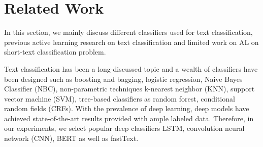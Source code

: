 \section{Related Work}
\label{sec:related}





In this section, we mainly discuss different classifiers used for text classification,  previous active learning research on text classification and limited work on AL on short-text classification problem. 

Text classification has been a long-discussed topic and a wealth of classifiers have been designed such as boosting and bagging\cite{opitz1999popular}, logistic regression\cite{walker1967estimation}, Naive Bayes Classifier (NBC)\cite{rish2001empirical}, non-parametric techniques k-nearest neighbor (KNN)\cite{altman1992introduction}, support vector machine (SVM)\cite{cortes1995support}, tree-based classifiers as random forest\cite{ho1995random}, conditional random fields (CRFs)\cite{lafferty2001conditional}. With the prevalence of deep learning, deep models have achieved state-of-the-art results provided with ample labeled data. Therefore, in our experiments, we select popular deep classifiers LSTM\cite{hochreiter1997long}, convolution neural network (CNN)\cite{kim2014convolutional}, BERT\cite{devlin2018bert} as well as fastText\cite{joulin2016bag}.


